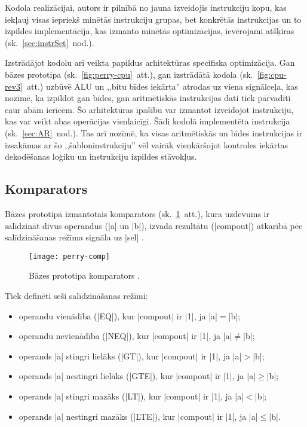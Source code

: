 	Kodola realizācijai, autors ir pilnībā no jauna izveidojis instrukciju
	kopu, kas iekļauj visas iepriekš minētās instrukciju grupas, bet
	konkrētās instrukcijas un to izpildes implementācija, kas izmanto minētās optimizācijas,
	ievērojami atšķiras (sk.~\ref{sec:instrSet}~nod.).
	
	Izstrādājot kodolu arī veikta papildus arhitektūras specifiska
	optimizācija. Gan bāzes prototipa (sk.~\ref{fig:perry-cpu}~att.),
	gan izstrādātā kodola (sk.~\ref{fig:cpu-rev3}~att.) uzbūvē ALU un
	,,bitu bīdes iekārta'' atrodas uz viena signālceļa, kas nozīmē, ka
	izpildot gan bīdes, gan aritmētiskās instrukcijas dati tiek pārvadīti
	caur abām ierīcēm. Šo arhitektūras īpašību var izmantot izveidojot
	instrukciju, kas var veikt abas operācijas vienlaicīgi.
	Šādi kodolā implementēta  instrukcija (sk.~\ref{sec:AR}~nod.).
	Tas arī nozīmē, ka visas aritmētiskās un bīdes instrukcijas ir izsakāmas
	ar šo ,,šabloninstrukciju'' vēl vairāk vienkāršojot kontroles iekārtas
	dekodēšanas loģiku un instrukciju izpildes stāvokļus.
	
\subsection{Komparators} \label{sec:perry-comp}
	Bāzes prototipā izmantotais komparators (sk.~\ref{fig:perry-comp}~att.),
	kura uzdevums ir salīdzināt	divus operandus (|a| un |b|), izvada
	rezultātu (|compout|) atkarībā pēc salīdzināšanas režīma signāla uz |sel|
	\cite[309.~lpp.]{Perry-VHDL}.
	\begin{figure}[thb]
		\centering
		\texttt{[image: perry-comp]}
		\caption[Bāzes prototipa komparators.]
		        {Bāzes prototipa komparators \cite[309.~lpp.]{Perry-VHDL}.}
		\label{fig:perry-comp}
	\end{figure}
	
	Tiek definēti seši salīdzināšanas režīmi:
	\begin{itemize}
		\item operandu vienādība (|EQ|), kur |compout| ir |1|, ja |a|$=$|b|;
		\item operandu nevienādība (|NEQ|), kur |compout| ir |1|, ja |a|$\neq$|b|;
		\item operands |a| stingri lielāks (|GT|), kur |compout| ir |1|, ja |a|$>$|b|;
		\item operands |a| nestingri lielāks (|GTE|), kur |compout| ir |1|, ja |a|$\geq$|b|;
		\item operands |a| stingri mazāks (|LT|), kur |compout| ir |1|, ja |a|$<$|b|;
		\item operands |a| nestingri mazāks (|LTE|), kur |compout| ir |1|, ja |a|$\leq$|b|.
	\end{itemize}
	

